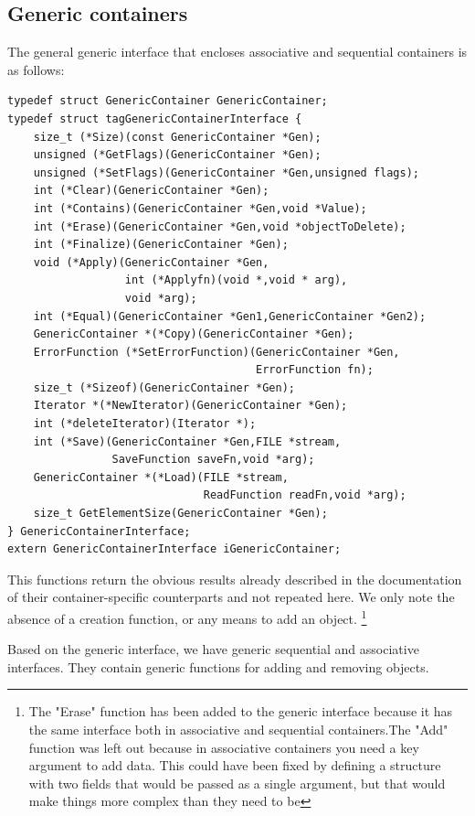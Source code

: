 \documentclass[12pt,a4paper]{memoir} %
\begin{document}
{{\subsection{Generic containers}
The general generic interface that encloses associative and sequential containers is as follows:
\begin{verbatim}
typedef struct GenericContainer GenericContainer;
typedef struct tagGenericContainerInterface {
    size_t (*Size)(const GenericContainer *Gen);
    unsigned (*GetFlags)(GenericContainer *Gen);
    unsigned (*SetFlags)(GenericContainer *Gen,unsigned flags);
    int (*Clear)(GenericContainer *Gen);
    int (*Contains)(GenericContainer *Gen,void *Value);
    int (*Erase)(GenericContainer *Gen,void *objectToDelete);
    int (*Finalize)(GenericContainer *Gen);
    void (*Apply)(GenericContainer *Gen,
                  int (*Applyfn)(void *,void * arg),
                  void *arg);
    int (*Equal)(GenericContainer *Gen1,GenericContainer *Gen2);
    GenericContainer *(*Copy)(GenericContainer *Gen);
    ErrorFunction (*SetErrorFunction)(GenericContainer *Gen,
                                      ErrorFunction fn);
    size_t (*Sizeof)(GenericContainer *Gen);
    Iterator *(*NewIterator)(GenericContainer *Gen);
    int (*deleteIterator)(Iterator *);
    int (*Save)(GenericContainer *Gen,FILE *stream, 
                SaveFunction saveFn,void *arg);
    GenericContainer *(*Load)(FILE *stream, 
                              ReadFunction readFn,void *arg);
    size_t GetElementSize(GenericContainer *Gen);
} GenericContainerInterface;
extern GenericContainerInterface iGenericContainer;
\end{verbatim}
This functions return the obvious results already described in the documentation of their container-specific counterparts and not repeated here. We only note the absence of a creation function, or any means to add an object.
\footnote{The "Erase" function  has been added to the generic interface because it has the same interface both in associative and sequential containers.The "Add" function was left out because in associative containers you need a key argument to add data. This could have been fixed by defining a structure with two fields that would be passed as a single argument, but that would make things more complex than they need to be}

Based on the generic interface, we have generic sequential and associative interfaces. They contain generic functions for adding and removing objects.
}}
\end{document}
